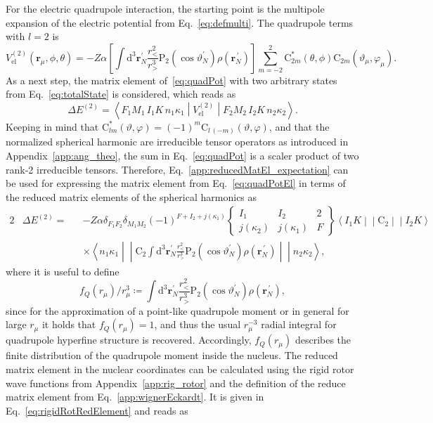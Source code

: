 For the electric quadrupole interaction, the starting point is the multipole expansion of the electric potential from Eq.~\eqref{eq:defmulti}. The quadrupole terms with $l=2$ is
\begin{equation}
V^{(2)}_{\text{el}}(\mathbf{r}_\mu,\phi,\theta)=-Z\alpha \left[ \int \text{d}^3\mathbf{r}^{\prime}_N \frac{r_<^2}{r_>^{3}}\text{P}_{2}(\cos \vartheta_N^{\prime})\rho(\mathbf{r}_N^{\,\prime})\right]\sum_{m=-2}^2 \text{C}^*_{2m}(\theta,\phi)\text{C}_{2m}(\vartheta_\mu,\varphi_\mu).
\label{eq:quadPot}
\end{equation}
As a next step, the matrix element of~\eqref{eq:quadPot} with two arbitrary states from Eq.~\eqref{eq:totalState} is considered, which reads as
\begin{equation}
\Delta E^{(2)}=\left<F_1M_1\,I_1K \,n_1\kappa_1 \middle| V^{(2)}_{\text{el}} \middle|F_2M_2\,I_2K \,n_2\kappa_2 \right>.
\label{eq:quadPotEl}
\end{equation}
Keeping in mind that $\text{C}_{lm}^*(\vartheta,\varphi) =(-1)^m\text{C}_{l\,(-m)}(\vartheta,\varphi)$, and that the normalized spherical harmonic are irreducible tensor operators as introduced in Appendix~\ref{app:ang_theo}, the sum in Eq.~\eqref{eq:quadPot} is a scaler product of two rank-2 irreducible tensors. Therefore, Eq.~\eqref{app:reducedMatEl_expectation} can be used for expressing the matrix element from Eq.~\eqref{eq:quadPotEl} in terms of the reduced matrix elements of the spherical harmonics as
\begin{alignat}{2}
&\Delta E^{(2)} =&& -Z\alpha\delta_{F_1F_2}\delta_{M_1M_2} (-1)^{F+I_2+j(\kappa_1)}
\begin{Bmatrix}
I_1 & I_2 & 2 \\
j(\kappa_2) & j(\kappa_1)&F
\end{Bmatrix}
\left<I_1K\middle|\middle|\text{C}_2 \middle|\middle| I_2 K \right>\\[7.5pt]
&&&\times\left<n_1\kappa_1\middle|\middle|\text{C}_2  \int \text{d}^3\mathbf{r}^{\prime}_N \frac{r_<^2}{r_>^{3}}\text{P}_{2}(\cos \vartheta_N^{\prime})\rho(\mathbf{r}_N^{\,\prime}) \middle|\middle| n_2\kappa_2 \right>,
\end{alignat} 
where it is useful to define
\begin{equation}
\label{eq:quadDistr}
f_Q(r_\mu)/r_\mu^3 \coloneqq \int \text{d}^3\mathbf{r}^{\prime}_N \frac{r_<^2}{r_>^{3}}\text{P}_{2}(\cos \vartheta_N^{\prime})\rho(\mathbf{r}_N^{\,\prime}),
\end{equation}
since for the approximation of a point-like quadrupole moment or in general for large $r_\mu$ it holds that $f_Q(r_\mu)=1$, and thus the usual $r_\mu^{-3}$ radial integral for quadrupole hyperfine structure is recovered. Accordingly, $f_Q(r_\mu)$ describes the finite distribution of the quadrupole moment inside the nucleus. The reduced matrix element in the nuclear coordinates can be calculated using the rigid rotor wave functions from Appendix~\ref{app:rig_rotor} and the definition of the reduce matrix element from Eq.~\eqref{app:wignerEckardt}. It is given in Eq.~\eqref{eq:rigidRotRedElement} and reads as
